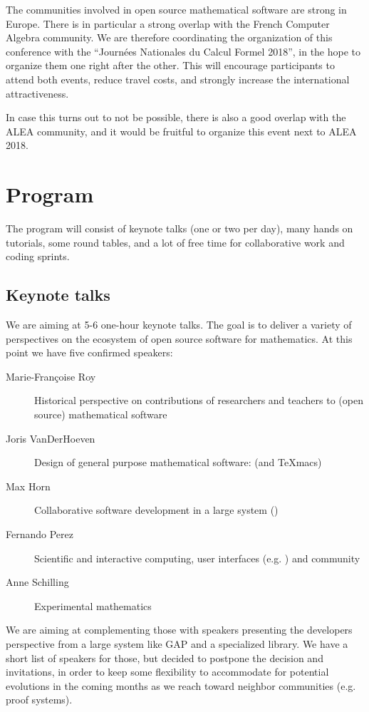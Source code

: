 \documentclass[12pt]{amsart}
\begin{document}
The communities involved in open source mathematical software are
strong in Europe. There is in particular a strong overlap with the
French Computer Algebra community. We are therefore coordinating the
organization of this conference with the ``Journées Nationales du
Calcul Formel 2018'', in the hope to organize them one right after the
other. This will encourage participants to attend both events, reduce
travel costs, and strongly increase the international attractiveness.

In case this turns out to not be possible, there is also a good
overlap with the ALEA community, and it would be fruitful to organize
this event next to ALEA 2018.

\section{Program}

The program will consist of keynote talks (one or two per day), many
hands on tutorials, some round tables, and a lot of free time for
collaborative work and coding sprints.

\subsection{Keynote talks}

We are aiming at 5-6 one-hour keynote talks. The goal is to deliver a
variety of perspectives on the ecosystem of open source software for
mathematics. At this point we have five confirmed speakers:

\begin{description}
\item[Marie-Françoise Roy] Historical perspective on contributions of
  researchers and teachers to (open source) mathematical software
\item[Joris VanDerHoeven] Design of general purpose mathematical software: \Mathemagix (and TeXmacs)
\item[Max Horn] Collaborative software development in a large system (\GAP)
\item[Fernando Perez] Scientific and interactive computing, user
  interfaces (e.g. \Jupyter) and community
\item[Anne Schilling] Experimental mathematics
\end{description}

We are aiming at complementing those with speakers presenting the
developers perspective from a large system like GAP and a specialized
library. We have a short list of speakers for those, but decided to
postpone the decision and invitations, in order to keep some
flexibility to accommodate for potential evolutions in the coming
months as we reach toward neighbor communities (e.g. proof systems).
\end{document}
